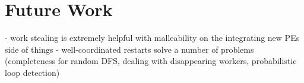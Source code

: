 \documentclass[enabledeprecatedfontcommands,12pt,a4paper,twoside]{scrartcl}
\numberwithin{equation}{section}
\begin{document}


\pagebreak
\section{Future Work}

- work stealing is extremely helpful with malleability on the integrating new PEs side of things
- well-coordinated restarts solve a number of problems (completeness for random DFS, dealing with disappearing workers, probabilistic loop detection)



\clearpage




\end{document}
